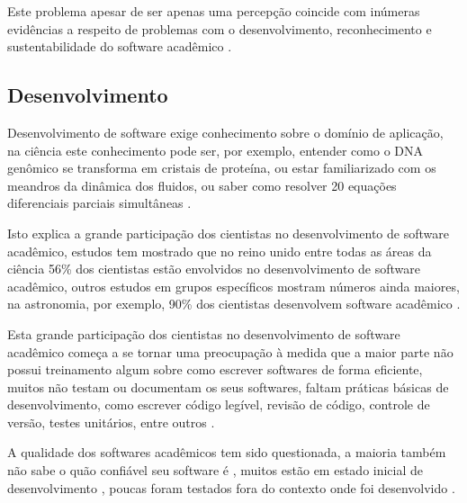 Este problema apesar de ser apenas uma percepção coincide com inúmeras
evidências a respeito de problemas com o desenvolvimento, reconhecimento e
sustentabilidade do software acadêmico \cite{allen2017engineering}.


\subsection{Desenvolvimento}

Desenvolvimento de software exige conhecimento sobre o domínio de aplicação, na
ciência este conhecimento pode ser, por exemplo, entender como o DNA genômico
se transforma em cristais de proteína, ou estar familiarizado com os meandros
da dinâmica dos fluidos, ou saber como resolver 20 equações diferenciais
parciais simultâneas \cite{segal2008developing}.

Isto explica a grande participação dos cientistas no desenvolvimento de
software acadêmico, estudos tem mostrado que no reino unido entre todas as
áreas da ciência 56\% dos cientistas estão envolvidos no desenvolvimento de
software acadêmico, outros estudos em grupos específicos mostram números ainda
maiores, na astronomia, por exemplo, 90\% dos cientistas desenvolvem software
acadêmico \cite{hettrick_2014_14809, momcheva2015software}.

Esta grande participação dos cientistas no
desenvolvimento de software acadêmico começa a se tornar uma preocupação à
medida que a maior parte não possui treinamento algum sobre como escrever
softwares de forma eficiente, muitos não testam ou documentam os seus
softwares, faltam práticas básicas de desenvolvimento, como escrever código
legível, revisão de código, controle de versão, testes unitários, entre outros
\cite{wilson2017good}.

A qualidade dos softwares acadêmicos tem sido questionada,
a maioria também não sabe o quão confiável seu software é \cite{Merali2010Computational},
muitos estão em estado inicial de desenvolvimento \cite{marshall2013tools},
poucas foram testados fora do contexto onde foi desenvolvido \cite{Portillo12}.

